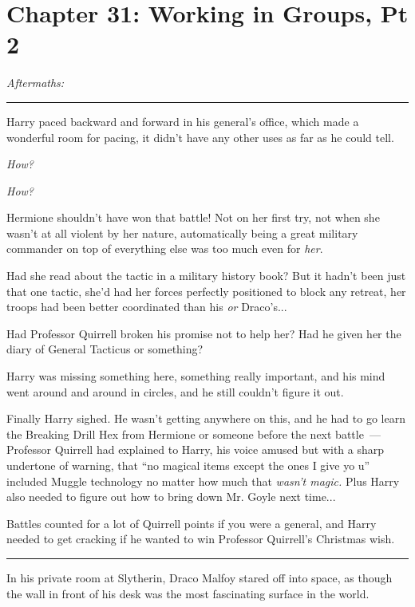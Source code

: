 \chapter{Chapter 31: Working in Groups, Pt 2}
\emph{Aftermaths:}

\begin{center}\rule{3in}{0.4pt}\end{center}

Harry paced backward and forward in his general's office, which made a wonderful room for pacing, it didn't have any other uses as far as he could tell.

\emph{How?}

\emph{How?}

Hermione shouldn't have won that battle! Not on her first try, not when she wasn't at all violent by her nature, automatically being a great military commander on top of everything else was too much even for \emph{her}.

Had she read about the tactic in a military history book? But it hadn't been just that one tactic, she'd had her forces perfectly positioned to block any retreat, her troops had been better coordinated than his \emph{or} Draco's...

Had Professor Quirrell broken his promise not to help her? Had he given her the diary of General Tacticus or something?

Harry was missing something here, something really important, and his mind went around and around in circles, and he still couldn't figure it out.

Finally Harry sighed. He wasn't getting anywhere on this, and he had to go learn the Breaking Drill Hex from Hermione or someone before the next battle~--- Professor Quirrell had explained to Harry, his voice amused but with a sharp undertone of warning, that ``no magical items except the ones I give yo u'' included Muggle technology no matter how much that \emph{wasn't magic.} Plus Harry also needed to figure out how to bring down Mr. Goyle next time...

Battles counted for a lot of Quirrell points if you were a general, and Harry needed to get cracking if he wanted to win Professor Quirrell's Christmas wish.

\begin{center}\rule{3in}{0.4pt}\end{center}

In his private room at Slytherin, Draco Malfoy stared off into space, as though the wall in front of his desk was the most fascinating surface in the world.


